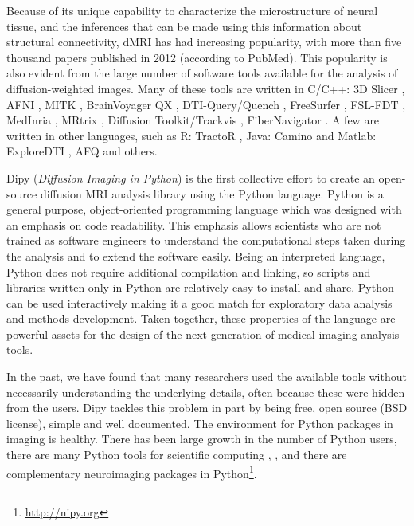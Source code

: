 \documentclass{bioinfo}
\begin{document}
Because of its unique capability to characterize the microstructure of neural
tissue, and the inferences that can be made using this information about
structural connectivity, dMRI has had increasing popularity, with more than five
thousand papers published in 2012 (according to PubMed). This popularity is
also evident from the large number of software tools available for the analysis
of diffusion-weighted images. Many of these tools are written in C/C++: 3D
Slicer \citep{pieper:06}, AFNI \citep{cox-afni:12}, MITK
\citep{fritzsche-mitk:12}, BrainVoyager QX \citep{goebel-brainvoyager:12},
DTI-Query/Quench \citep{sherbondy:05}, FreeSurfer \citep{fischl-freesurfer:12},
FSL-FDT \citep{smith-fdt:04}, MedInria \citep{toussaint-souplet-etal:07},
MRtrix \citep{Tournier2012}, Diffusion Toolkit/Trackvis
\citep{wang-diffusion-toolkit:07}, FiberNavigator \citep{vaillancourt:11,
  chamberland:13}. A few are written in other languages, such as R:
TractoR \citep{ clayden-TractoR:11}, Java: Camino \citep{Cook2006} and Matlab:
ExploreDTI \citep{leemans-exploredti:09}, AFQ \citep{yeatman2012afq} and
others.

Dipy (\textit{Diffusion Imaging in Python}) \citep{garyfallidis2011dipy} is
the first collective effort to create an open-source diffusion MRI analysis
library using the Python language. Python is a general purpose, object-oriented
programming language which was designed with an emphasis on code readability.
This emphasis allows scientists who are not trained as software engineers to
understand the computational steps taken during the analysis and to extend the software
easily. Being an interpreted language, Python does not require
additional compilation and linking, so scripts and libraries written only in
Python are relatively easy to install and share. Python can be used
interactively making it a good match for exploratory data analysis and
methods development.  Taken together, these properties of the language are
powerful assets for the design of the next generation of medical imaging
analysis tools.

In the past, we have found that many researchers used the available
tools without necessarily understanding the underlying details, often because these
were hidden from the users. Dipy tackles this problem in part by being free, open
source (BSD license), simple and well documented. The environment for Python
packages in imaging is healthy. There has been large growth in the number of
Python users, there are many Python tools for scientific computing
\citep{perez_python:11}, \citep{mckinney_python:12}, \citep{perez_ipython:07}
and there are complementary neuroimaging packages in
Python\footnote{\url{http://nipy.org}}.
\end{document}

